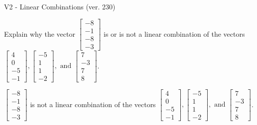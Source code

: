 \begin{exercise}
  \begin{exerciseTitle}V2 - Linear Combinations (ver. 230)\end{exerciseTitle}
  \begin{exerciseStatement}
    Explain why the vector \(\left[\begin{array}{c}
-8 \\
-1 \\
-8 \\
-3
\end{array}\right]\)  is or is not a linear 
	combination of the vectors \(\left[\begin{array}{c}
4 \\
0 \\
-5 \\
-1
\end{array}\right] , \left[\begin{array}{c}
-5 \\
1 \\
1 \\
-2
\end{array}\right] , \text{ and } \left[\begin{array}{c}
7 \\
-3 \\
7 \\
8
\end{array}\right]\).
	


  \end{exerciseStatement}
  \begin{exerciseAnswer}
   \(\left[\begin{array}{c}
-8 \\
-1 \\
-8 \\
-3
\end{array}\right]\) 
  	 is not  
	a linear combination of the vectors \(\left[\begin{array}{c}
4 \\
0 \\
-5 \\
-1
\end{array}\right] , \left[\begin{array}{c}
-5 \\
1 \\
1 \\
-2
\end{array}\right] , \text{ and } \left[\begin{array}{c}
7 \\
-3 \\
7 \\
8
\end{array}\right]\).

	
  


  \end{exerciseAnswer}
\end{exercise}